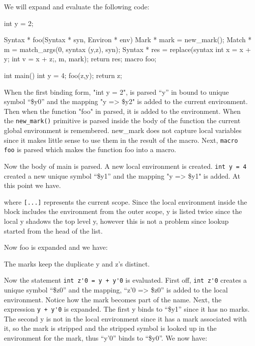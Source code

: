 \documentclass[12pt,english,letterpaper]{article}
\begin{document}
We will expand and evaluate the following code:

\begin{code}
int y = 2;

Syntax * foo(Syntax * syn, Environ * env) {
  Mark * mark = new_mark();
  Match * m = match_args(0, syntax (y,z), syn);
  Syntax * res = replace(syntax {int x = x + y;
                                 int v = x + z;}, m, mark);
  return res;
}
macro foo;

int main() {
  int y = 4;
  foo(z,y);
  return z;
}
\end{code}

When the first binding form, "int y = 2", is parsed ``y'' in bound to
unique symbol ``\$y0'' and the mapping "y => \$y2" is added to the
current environment.  Then when the function "foo" in parsed, it is
added to the environment.  When the \verb/new_mark()/ primitive is
parsed inside the body of the function the current global environment
is remembered.  new\_mark does not capture local variables since it
makes little sense to use them in the result of the macro.  Next,
\verb/macro foo/ is parsed which makes the function foo into a macro.

Now the body of main is parsed.  A new local environment is created.
\verb/int y = 4/ created a new unique symbol ``\$y1'' and the mapping
"y => \$y1" is added.  At this point we have.


where \verb/[...]/ represents the current scope.  Since the local
environment inside the block includes the environment from the outer
scope, y is listed twice since the local y shadows the top level y,
however this is not a problem since lookup started from the head of
the list.

Now foo is expanded and we have:


The marks keep the duplicate y and z's distinct.

Now the statement \verb/int z'0 = y + y'0/ is evaluated.  First off,
\verb/int z'0/ creates a unique symbol ``\$z0'' and the mapping, ``z'0
=> \$z0'' is added to the local environment.  Notice how the mark
becomes part of the name.  Next, the expression \verb/y + y'0/ is
expanded.  The first y binds to ``\$y1'' since it has no marks.  The
second y is not in the local environment since it has a mark
associated with it, so the mark is stripped and the stripped symbol is
looked up in the environment for the mark, thus ``y'0'' binds to
``\$y0''.  We now have:
\end{document}
